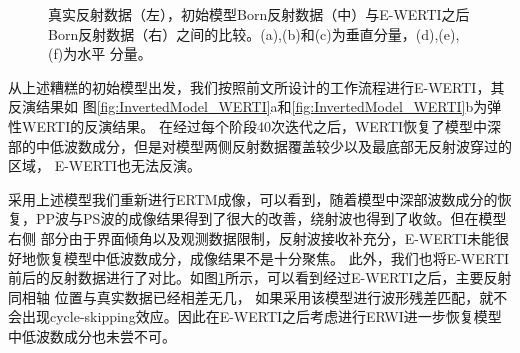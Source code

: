 \begin{figure}[!htb]
   \caption{真实反射数据（左），初始模型Born反射数据（中）与E-WERTI之后Born反射数据（右）之间的比较。(a),(b)和(c)为垂直分量，(d),(e),(f)为水平
   分量。}
   \label{fig:Data_comparison}
\end{figure}

从上述糟糕的初始模型出发，我们按照前文所设计的工作流程进行E-WERTI，其反演结果如
图\ref{fig:InvertedModel_WERTI}a和\ref{fig:InvertedModel_WERTI}b为弹性WERTI的反演结果。
在经过每个阶段40次迭代之后，WERTI恢复了模型中深部的中低波数成分，但是对模型两侧反射数据覆盖较少以及最底部无反射波穿过的区域，
E-WERTI也无法反演。

采用上述模型我们重新进行ERTM成像，可以看到，随着模型中深部波数成分的恢复，PP波与PS波的成像结果得到了很大的改善，绕射波也得到了收敛。但在模型右侧
部分由于界面倾角以及观测数据限制，反射波接收补充分，E-WERTI未能很好地恢复模型中低波数成分，成像结果不是十分聚焦。
此外，我们也将E-WERTI前后的反射数据进行了对比。如图\ref{fig:Data_comparison}所示，可以看到经过E-WERTI之后，主要反射同相轴
位置与真实数据已经相差无几，
如果采用该模型进行波形残差匹配，就不会出现cycle-skipping效应。因此在E-WERTI之后考虑进行ERWI进一步恢复模型中低波数成分也未尝不可。

